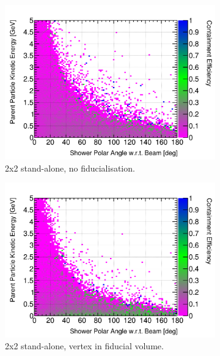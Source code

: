 \documentclass[10pt,a4paper,openany]{article}
\begin{document}
\begin{figure}[htbp]
	\centering
	\begin{subfigure}[b]{0.49\textwidth}
		\centering
		\includegraphics[width=1.0\textwidth]{Pi0_cont_eff_2x2.png}
		\caption{2x2 stand-alone, no fiducialisation.}
		\label{}
	\end{subfigure}	
	\hfill
	\begin{subfigure}[b]{0.49\textwidth}
		\centering
    \includegraphics[width=1.0\textwidth]{Pi0_cont_eff_2x2_fiducial.png}
		\caption{2x2 stand-alone, vertex in fiducial volume.}
		\label{}
	\end{subfigure}	
	\begin{subfigure}[b]{0.49\textwidth}
		\centering

\end{subfigure}
\end{figure}
\end{document}
